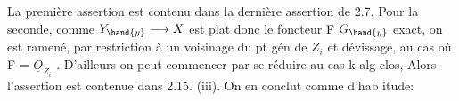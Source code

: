 La première assertion est contenu dans la dernière assertion de
2.7. Pour la seconde, comme  $Y_{\hand{y}} \longrightarrow X$ est plat donc le foncteur F \hand{$\rightsquigarrow$} $G_{\hand{y}}$
exact,  on est ramené, par restriction à un voisinage du pt gén de $Z_i$
et dévissage, au cas où F = $\underline{O}_{Z_i}$  . D'ailleurs on peut commencer par
se réduire au cas k alg clos,  Alors  l'assertion  est
contenue dans 2.15. (iii).   On en conclut comme d'hab itude:

